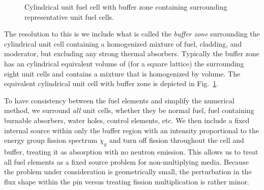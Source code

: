 \begin{figure}[tb!]
\begin{center}


\caption{Cylindrical unit fuel cell with buffer zone containing surrounding representative unit fuel cells.}
\label{Fig:neutronics_cylindicalFuelCell_Buffer}
\end{center}
\end{figure}


The resolution to this is we include what is called the \emph{buffer zone} surrounding the cylindrical unit cell containing a homogenized mixture of fuel, cladding, and moderator, but excluding any strong thermal absorbers. Typically the buffer zone has an cylindrical equivalent volume of (for a square lattice) the surrounding eight unit cells and contains a mixture that is homogenized by volume. The equivalent cylindrical unit cell with buffer zone is depicted in Fig.~\ref{Fig:neutronics_cylindicalFuelCell_Buffer}.

To have consistency between the fuel elements and simplify the numerical method, we surround \emph{all} unit cells, whether they be normal fuel, fuel containing burnable absorbers, water holes, control elements, etc. We then include a fixed internal source within only the buffer region with an intensity proportional to the energy group fission spectrum $\chi_g$ and turn off fission throughout the cell and buffer, treating it as absorption with no neutron emission. This allows us to treat all fuel elements as a fixed source problem for non-multiplying media. Because the problem under consideration is geometrically small, the perturbation in the flux shape within the pin versus treating fission multiplication is rather minor.

